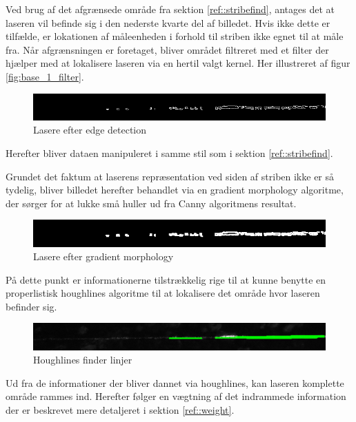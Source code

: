 Ved brug af det afgrænsede område fra sektion \ref{ref::stribefind}, antages det at laseren vil befinde sig i den nederste kvarte del af billedet. Hvis ikke dette er tilfælde, er lokationen af måleenheden i forhold til striben ikke egnet til at måle fra.
Når afgrænsningen er foretaget, bliver området filtreret med et filter der hjælper med at lokalisere laseren via en hertil valgt kernel. Her illustreret af figur \ref{fig:base_1_filter}.

\begin{figure}[h]
	\centering
	\includegraphics[width=0.7\linewidth]{Billeder/base_2_canny}
	\caption{Lasere efter edge detection}
	\label{fig:base_2_canny}
\end{figure}

Herefter bliver dataen manipuleret i samme stil som i sektion \ref{ref::stribefind}.

Grundet det faktum at laserens repræsentation ved siden af striben ikke er så tydelig, bliver billedet herefter behandlet via en gradient morphology algoritme, der sørger for at lukke små huller ud fra Canny algoritmens resultat.

\begin{figure}[h]
	\centering
	\includegraphics[width=0.7\linewidth]{Billeder/base_3_morph}
	\caption{Lasere efter gradient morphology}
	\label{fig:base_3_morph}
\end{figure}

På dette punkt er informationerne tilstrækkelig rige til at kunne benytte en properlistisk houghlines algoritme til at lokalisere det område hvor laseren befinder sig.

\begin{figure}[h!]
	\centering
	\includegraphics[width=0.7\linewidth]{Billeder/base_4_houghP}
	\caption{Houghlines finder linjer}
	\label{fig:base_4_hough}
\end{figure}

Ud fra de informationer der bliver dannet via houghlines, kan laseren komplette område rammes ind. Herefter følger en vægtning af det indrammede information der er beskrevet mere detaljeret i sektion \ref{ref::weight}.

